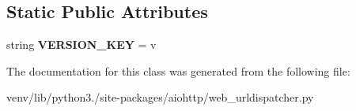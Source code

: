 \subsection*{Static Public Attributes}
\begin{DoxyCompactItemize}
\item 
\mbox{\label{classaiohttp_1_1web__urldispatcher_1_1_static_resource_a8abb6cf6da78ec886c60f8fcea8a5bbf}} 
string {\bfseries V\+E\+R\+S\+I\+O\+N\+\_\+\+K\+EY} = \textquotesingle{}v\textquotesingle{}
\end{DoxyCompactItemize}


The documentation for this class was generated from the following file\+:\begin{DoxyCompactItemize}
\item 
venv/lib/python3./site-\/packages/aiohttp/web\+\_\+urldispatcher.\+py\end{DoxyCompactItemize}
